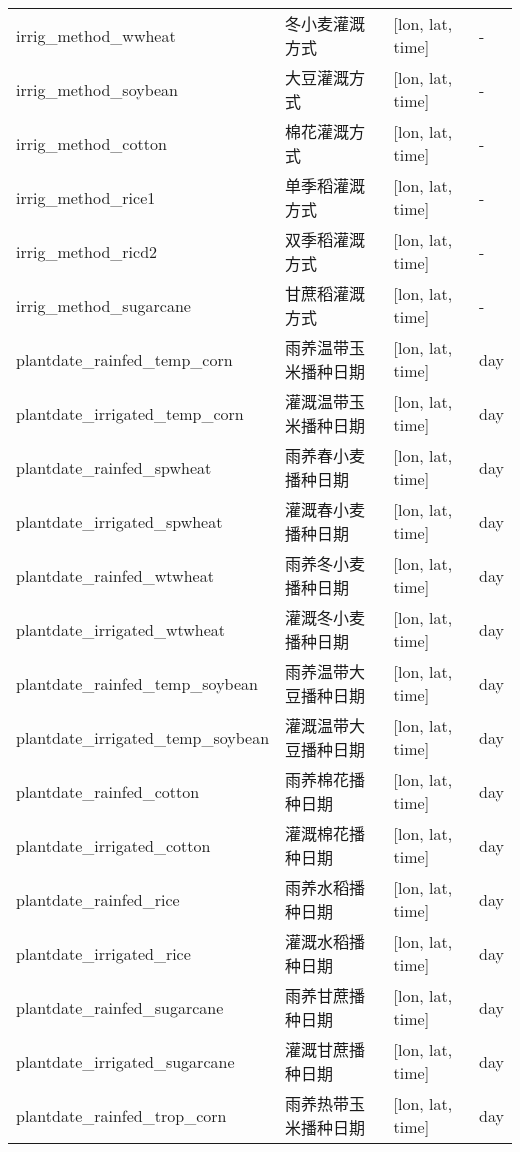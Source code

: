 {\begin{longtable}[htbp]{lp{}ll}
irrig\_method\_wwheat & 冬小麦灌溉方式 & {[}lon, lat, time{]} & - \\
irrig\_method\_soybean & 大豆灌溉方式 & {[}lon, lat, time{]} & - \\
irrig\_method\_cotton & 棉花灌溉方式 & {[}lon, lat, time{]} & - \\
irrig\_method\_rice1 & 单季稻灌溉方式 & {[}lon, lat, time{]} & - \\
irrig\_method\_ricd2 & 双季稻灌溉方式 & {[}lon, lat, time{]} & - \\
irrig\_method\_sugarcane & 甘蔗稻灌溉方式 & {[}lon, lat, time{]} & - \\
plantdate\_rainfed\_temp\_corn & 雨养温带玉米播种日期 & {[}lon, lat, time{]} & \unit{day} \\
plantdate\_irrigated\_temp\_corn & 灌溉温带玉米播种日期 & {[}lon, lat, time{]} & \unit{day} \\
plantdate\_rainfed\_spwheat & 雨养春小麦播种日期 & {[}lon, lat, time{]} & \unit{day} \\
plantdate\_irrigated\_spwheat & 灌溉春小麦播种日期 & {[}lon, lat, time{]} & \unit{day} \\
plantdate\_rainfed\_wtwheat & 雨养冬小麦播种日期 & {[}lon, lat, time{]} & \unit{day} \\
plantdate\_irrigated\_wtwheat & 灌溉冬小麦播种日期 & {[}lon, lat, time{]} & \unit{day} \\
plantdate\_rainfed\_temp\_soybean & 雨养温带大豆播种日期 & {[}lon, lat, time{]} & \unit{day} \\
plantdate\_irrigated\_temp\_soybean & 灌溉温带大豆播种日期 & {[}lon, lat, time{]} & \unit{day} \\
plantdate\_rainfed\_cotton & 雨养棉花播种日期 & {[}lon, lat, time{]} & \unit{day} \\
plantdate\_irrigated\_cotton & 灌溉棉花播种日期 & {[}lon, lat, time{]} & \unit{day} \\
plantdate\_rainfed\_rice & 雨养水稻播种日期 & {[}lon, lat, time{]} & \unit{day} \\
plantdate\_irrigated\_rice & 灌溉水稻播种日期 & {[}lon, lat, time{]} & \unit{day} \\
plantdate\_rainfed\_sugarcane & 雨养甘蔗播种日期 & {[}lon, lat, time{]} & \unit{day} \\
plantdate\_irrigated\_sugarcane & 灌溉甘蔗播种日期 & {[}lon, lat, time{]} & \unit{day} \\
plantdate\_rainfed\_trop\_corn & 雨养热带玉米播种日期 & {[}lon, lat, time{]} & \unit{day} \\

\end{longtable}}
